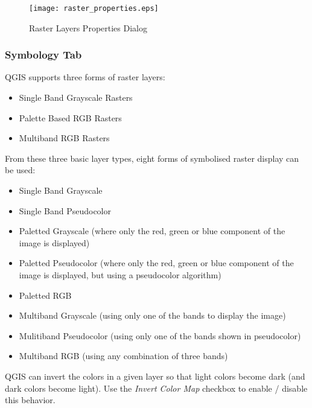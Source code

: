 \begin{figure}[h]
   \begin{center}
   \caption{Raster Layers Properties
Dialog}\label{fig:raster_properties}\smallskip
   \texttt{[image: raster\_properties.eps]}
\end{center}  
\end{figure}

\subsubsection{Symbology Tab}\label{label_sombology}

QGIS supports three forms of raster layers:

\begin{itemize}
\item Single Band Grayscale Rasters
\item Palette Based RGB Rasters
\item Multiband RGB Rasters
\end{itemize}

From these three basic layer types, eight forms of symbolised raster display
can be used:

\begin{itemize}
\item Single Band Grayscale
\item Single Band Pseudocolor
\item Paletted Grayscale (where only the red, green or blue component of the
image is displayed)
\item Paletted Pseudocolor (where only the red, green or blue component of the
image is displayed, but using a pseudocolor algorithm)
\item Paletted RGB
\item Multiband Grayscale (using only one of the bands to display the image)
\item Mulitiband Pseudocolor (using only one of the bands shown in
pseudocolor)
\item Multiband RGB (using any combination of three bands)
\end{itemize}

\smallskip

QGIS can invert the colors in a given layer so that light colors become dark
(and dark colors become light). Use the \textsl{Invert Color Map} checkbox to
enable / disable this behavior.

